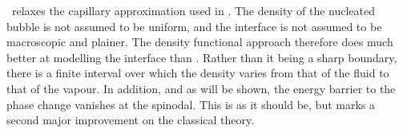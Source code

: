 \Dft\ relaxes the capillary approximation used in \cnt.
The density of the nucleated bubble is not assumed to be uniform,
and the interface is not assumed to be macroscopic and plainer\cite{Oxtoby1992, Oxtoby1988}.
The density functional approach therefore does much better at modelling the interface than \cnt.
Rather than it being a sharp boundary,
there is a finite interval over which the density varies from that of the fluid to that of the vapour.
In addition, and as will be shown, the energy barrier to the phase change vanishes at the spinodal.
This is as it should be, but marks a second major improvement on the classical theory\cite{Talanquer1994}.






%  

